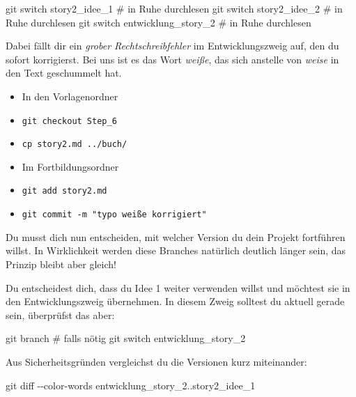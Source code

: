 \documentclass[
  letterpaper,
  DIV=11]{scrreprt}
\newenvironment{Shaded}{\begin{snugshade}}{\end{snugshade}}
\newcommand{\AttributeTok}[1]{\textcolor[rgb]{0.40,0.45,0.13}{#1}}
\newcommand{\CommentTok}[1]{\textcolor[rgb]{0.37,0.37,0.37}{#1}}
\newcommand{\FunctionTok}[1]{\textcolor[rgb]{0.28,0.35,0.67}{#1}}
\newcommand{\NormalTok}[1]{\textcolor[rgb]{0.00,0.23,0.31}{#1}}
\begin{document}
\begin{Shaded}
\begin{Highlighting}[]
\FunctionTok{git}\NormalTok{ switch story2\_idee\_1        }\CommentTok{\# in Ruhe durchlesen}
\FunctionTok{git}\NormalTok{ switch story2\_idee\_2        }\CommentTok{\# in Ruhe durchlesen }
\FunctionTok{git}\NormalTok{ switch entwicklung\_story\_2  }\CommentTok{\# in Ruhe durchlesen}
\end{Highlighting}
\end{Shaded}

Dabei fällt dir ein \emph{grober Rechtschreibfehler} im
Entwicklungszweig auf, den du sofort korrigierst. Bei uns ist es das
Wort \emph{weiße}, das sich anstelle von \emph{weise} in den Text
geschummelt hat.

\begin{itemize}
\item
  In den Vorlagenordner
\item
  \texttt{git\ checkout\ Step\_6}
\item
  \texttt{cp\ story2.md\ ../buch/}
\item
  Im Fortbildungsordner
\item
  \texttt{git\ add\ story2.md}
\item
  \texttt{git\ commit\ -m\ "typo\ \textquotesingle{}weiße\textquotesingle{}\ korrigiert"}
\end{itemize}

Du musst dich nun entscheiden, mit welcher Version du dein Projekt
fortführen willst. In Wirklichkeit werden diese Branches natürlich
deutlich länger sein, das Prinzip bleibt aber gleich!

Du entscheidest dich, dass du Idee 1 weiter verwenden willst und
möchtest sie in den Entwicklungszweig übernehmen. In diesem Zweig
solltest du aktuell gerade sein, überprüfst das aber:

\begin{Shaded}
\begin{Highlighting}[]
\FunctionTok{git}\NormalTok{ branch}
\CommentTok{\# falls nötig}
\FunctionTok{git}\NormalTok{ switch entwicklung\_story\_2}
\end{Highlighting}
\end{Shaded}

Aus Sicherheitsgründen vergleichst du die Versionen kurz miteinander:

\begin{Shaded}
\begin{Highlighting}[]
\FunctionTok{git}\NormalTok{ diff }\AttributeTok{{-}{-}color{-}words}\NormalTok{ entwicklung\_story\_2..story2\_idee\_1}
\end{Highlighting}
\end{Shaded}
\end{document}
